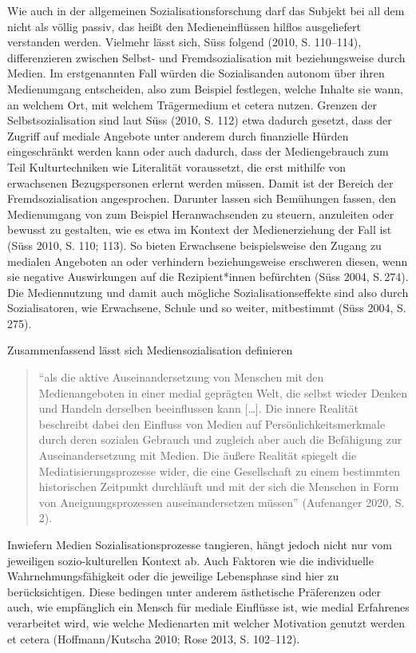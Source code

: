 \documentclass[a4paper,
fontsize=11pt,
oneside,
numbers=noperiodatend,
parskip=half-,
bibliography=totoc,
final
]{scrartcl}
\begin{document}
Wie auch in der allgemeinen Sozialisationsforschung darf das Subjekt bei
all dem nicht als völlig passiv, das heißt den Medieneinflüssen hilflos
ausgeliefert verstanden werden. Vielmehr lässt sich, Süss folgend (2010,
S. 110--114), differenzieren zwischen Selbst- und Fremdsozialisation mit
beziehungsweise durch Medien. Im erstgenannten Fall würden die
Sozialisanden autonom über ihren Medienumgang entscheiden, also zum
Beispiel festlegen, welche Inhalte sie wann, an welchem Ort, mit welchem
Trägermedium et cetera nutzen. Grenzen der Selbstsozialisation sind laut
Süss (2010, S. 112) etwa dadurch gesetzt, dass der Zugriff auf mediale
Angebote unter anderem durch finanzielle Hürden eingeschränkt werden
kann oder auch dadurch, dass der Mediengebrauch zum Teil Kulturtechniken
wie Literalität voraussetzt, die erst mithilfe von erwachsenen
Bezugspersonen erlernt werden müssen. Damit ist der Bereich der
Fremdsozialisation angesprochen. Darunter lassen sich Bemühungen fassen,
den Medienumgang von zum Beispiel Heranwachsenden zu steuern, anzuleiten
oder bewusst zu gestalten, wie es etwa im Kontext der Medienerziehung
der Fall ist (Süss 2010, S. 110; 113). So bieten Erwachsene
beispielsweise den Zugang zu medialen Angeboten an oder verhindern
beziehungsweise erschweren diesen, wenn sie negative Auswirkungen auf
die Rezipient*innen befürchten (Süss 2004, S.\,274). Die Mediennutzung
und damit auch mögliche Sozialisationseffekte sind also durch
Sozialisatoren, wie Erwachsene, Schule und so weiter, mitbestimmt (Süss
2004, S. 275).

Zusammenfassend lässt sich Mediensozialisation definieren
\begin{quote} 
\enquote{als
die aktive Auseinandersetzung von Menschen mit den Medienangeboten in
einer medial geprägten Welt, die selbst wieder Denken und Handeln
derselben beeinflussen kann {[}\ldots{]}. Die innere Realität beschreibt
dabei den Einfluss von Medien auf Persönlichkeitsmerkmale durch deren
sozialen Gebrauch und zugleich aber auch die Befähigung zur
Auseinandersetzung mit Medien. Die äußere Realität spiegelt die
Mediatisierungsprozesse wider, die eine Gesellschaft zu einem bestimmten
historischen Zeitpunkt durchläuft und mit der sich die Menschen in Form
von Aneignungsprozessen auseinandersetzen müssen} (Aufenanger 2020, S.
2).
\end{quote}

Inwiefern Medien Sozialisationsprozesse tangieren, hängt jedoch nicht
nur vom jeweiligen sozio-kulturellen Kontext ab. Auch Faktoren wie die
individuelle Wahrnehmungsfähigkeit oder die jeweilige Lebensphase sind
hier zu berücksichtigen. Diese bedingen unter anderem ästhetische
Präferenzen oder auch, wie empfänglich ein Mensch für mediale Einflüsse
ist, wie medial Erfahrenes verarbeitet wird, wie welche Medienarten mit
welcher Motivation genutzt werden et cetera (Hoffmann/Kutscha 2010; Rose
2013, S. 102--112).
\end{document}
